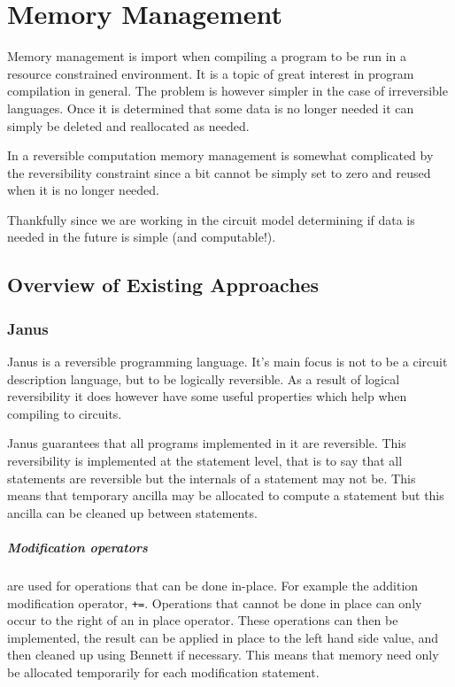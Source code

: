 \chapter{Memory Management}

Memory management is import when compiling a program to be run in a resource
constrained environment. It is a topic of great interest in program compilation
in general. The problem is however simpler in the case of irreversible
languages. Once it is determined that some data is no longer needed it can
simply be deleted and reallocated as needed.

In a reversible computation memory management is somewhat complicated by the
reversibility constraint since a bit cannot be simply set to zero and reused
when it is no longer needed.

Thankfully since we are working in the circuit model determining if data is
needed in the future is simple (and computable!).

\section{Overview of Existing Approaches}

\subsection{Janus}
Janus\cite{YG:2007,LD:1982} is a reversible programming
language.  It's main focus is not to be a circuit description language, but to
be logically reversible. As a result of logical reversibility it does however have some
useful properties which help when compiling to circuits.

Janus guarantees that all programs implemented in it are reversible.
This reversibility is implemented at the statement level, that is to say that
all statements are reversible but the internals of a statement may not be.
This means that temporary ancilla may be allocated to compute a statement but
this ancilla can be cleaned up between statements.

\paragraph{Modification operators} are used for operations that can be done
in-place. For example the addition modification operator, \verb|+=|. Operations
that cannot be done in place can only occur to the right of an in place
operator. These operations can then be implemented, the result can be applied in
place to the left hand side value, and then cleaned up using Bennett if
necessary. This means that memory need only be allocated temporarily for each
modification statement.

